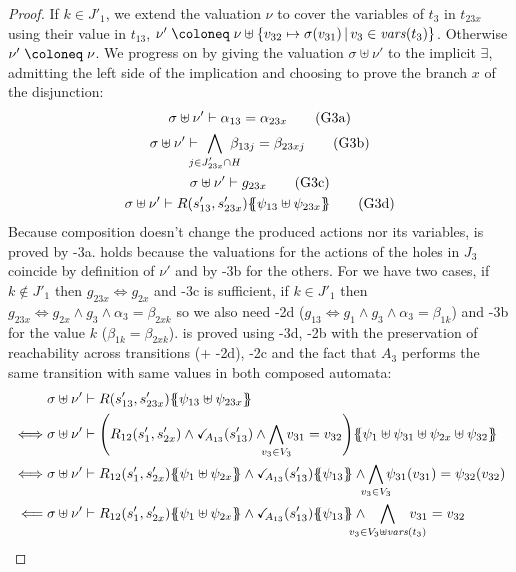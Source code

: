 \documentclass{article}
\begin{document}
\begin{proof}
	If \(k \in J'_1\), we extend the valuation \(\nu\) to cover the variables of \(t_3\) in \(t_{23x}\) using their value in \(t_{13}\), \(\nu' \defobject \nu \uplus \mset{v_{32} \mapsto \sigma\mpar{v_{31}}}{v_3 \in \fvars{t_3}}\).
	Otherwise \(\nu' \defobject \nu\).
	We progress on  by giving the valuation \(\sigma \uplus \nu'\) to the implicit \(\exists\), admitting the left side of the implication and choosing to prove the branch \(x\) of the disjunction:
	\begin{gather}
		\sigma \uplus \nu' \vdash \alpha_{13} = \alpha_{23x} \goal{3a} \\
		\sigma \uplus \nu' \vdash \bigwedge_\subbox{j \in J'_{23x} \cap H} \beta_{13j} = \beta_{23xj} \goal{3b} \\
		\sigma \uplus \nu' \vdash g_{23x} \goal{3c} \\
		\sigma \uplus \nu' \vdash R\mpar{s'_{13}, s'_{23x}}\psubst{\psi_{13} \uplus \psi_{23x}} \goal{3d}
	\end{gather}
	Because composition doesn't change the produced actions nor its variables,  is proved by \hyp{3a}.
	 holds because the valuations for the actions of the holes in \(J_3\) coincide by definition of \(\nu'\) and by \hyp{3b} for the others.
	For  we have two cases, if \(k \notin J'_1\) then \(g_{23x} \iff g_{2x}\) and \hyp{3c} is sufficient, if \(k \in J'_1\) then \(g_{23x} \iff g_{2x} \wedge g_3 \wedge \alpha_3 = \beta_{2xk}\) so we also need \hyp{2d} (\(g_{13} \iff g_1 \wedge g_3 \wedge \alpha_3 = \beta_{1k}\)) and \hyp{3b} for the value \(k\) (\(\beta_{1k} = \beta_{2xk}\)).
	 is proved using \hyp{3d}, \hyp{2b} with the preservation of reachability across transitions (+ \hyp{2d}), \hyp{2c} and the fact that \(A_3\) performs the same transition with same values in both composed automata:
	\begin{align*}
		& \sigma \uplus \nu' \vdash R\mpar{s'_{13}, s'_{23x}}\psubst{\psi_{13} \uplus \psi_{23x}} \\
		\iff & \sigma \uplus \nu' \vdash \mpar{R_{12}\mpar{s'_1, s'_{2x}} \wedge \reach{A_{13}}\mpar{s'_{13}} \wedge \bigwedge_\subbox{v_3 \in V_3} v_{31} = v_{32}}\psubst{\psi_1 \uplus \psi_{31} \uplus \psi_{2x} \uplus \psi_{32}} \\
		\iff & \sigma \uplus \nu' \vdash R_{12}\mpar{s'_1, s'_{2x}}\psubst{\psi_1 \uplus \psi_{2x}} \wedge \reach{A_{13}}\mpar{s'_{13}}\psubst{\psi_{13}} \wedge \bigwedge_\subbox{v_3 \in V_3} \psi_{31}\mpar{v_{31}} = \psi_{32}\mpar{v_{32}} \\
		\impliedby & \sigma \uplus \nu' \vdash R_{12}\mpar{s'_1, s'_{2x}}\psubst{\psi_1 \uplus \psi_{2x}} \wedge \reach{A_{13}}\mpar{s'_{13}}\psubst{\psi_{13}} \wedge \bigwedge_\subbox{v_3 \in V_3 \uplus \fvars{t_3}} v_{31} = v_{32} \\

\end{align*}
\end{proof}
\end{document}
